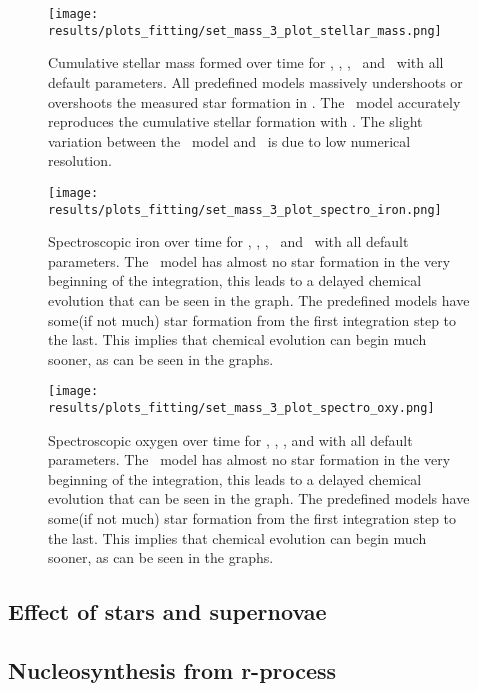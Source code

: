 \begin{figure}[h]
  \centering
  \texttt{[image: results/plots\_fitting/set\_mass\_3\_plot\_stellar\_mass.png]}
  \caption[]{\label{fig:fit-v1-3-stellar}
    Cumulative stellar mass formed over time for \eris, \mwomega, \mwcomega, \fiduccialomega\ and \omegamodel\ with all default parameters.
    All predefined models massively undershoots or overshoots the measured star formation in \eris.
    The \fiduccialomega\ model accurately reproduces the cumulative stellar formation with \eris. The slight variation between the \fiduccialomega\ model and \eris\ is due to low numerical resolution.
  }
\end{figure}
\begin{figure}[h]
  \centering
  \texttt{[image: results/plots\_fitting/set\_mass\_3\_plot\_spectro\_iron.png]}
  \caption[]{\label{fig:fit-v1-3-iron}
    Spectroscopic iron over time for \eris, \mwomega, \mwcomega, \fiduccialomega\ and \omegamodel\ with all default parameters.
    The \fiduccialomega\ model has almost no star formation in the very beginning of the integration, this leads to a delayed chemical evolution that can be seen in the graph. The predefined models have some(if not much) star formation from the first integration step to the last. This implies that chemical evolution can begin much sooner, as can be seen in the graphs.
  }
\end{figure}
\begin{figure}[h]
  \centering
  \texttt{[image: results/plots\_fitting/set\_mass\_3\_plot\_spectro\_oxy.png]}
  \caption[]{\label{fig:fit-v1-3-oxy}
    Spectroscopic oxygen over time for \eris, \mwomega, \mwcomega, \fiduccialomega and \omegamodel with all default parameters.
    The \fiduccialomega\ model has almost no star formation in the very beginning of the integration, this leads to a delayed chemical evolution that can be seen in the graph. The predefined models have some(if not much) star formation from the first integration step to the last. This implies that chemical evolution can begin much sooner, as can be seen in the graphs.
  }
\end{figure}

\subsection{Effect of stars and supernovae}
\subsection{Nucleosynthesis from r-process}
